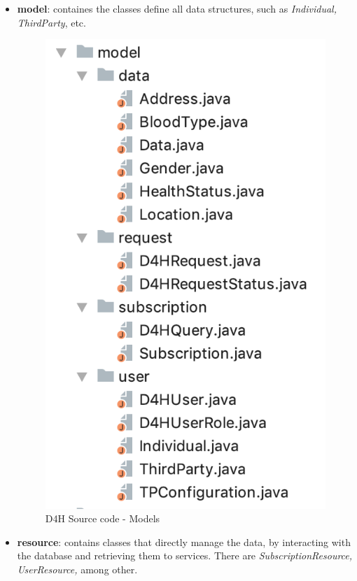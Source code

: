 \documentclass[a4paper, hidelinks, 12pt]{report}
\begin{document}
	\begin{itemize}
		\item \textbf{model}: containes the classes define all data structures, such as \textit{Individual, ThirdParty}, etc.

	\begin{figure}[H]
		\centering
		\includegraphics[scale=0.6]{images/backend/d4h_source_code_models.png}
		\caption[D4H Source code - Models]{D4H Source code - Models}
		\label{fig:d4h_source_code_models}
	\end{figure}

		\item \textbf{resource}: contains classes that directly manage the data, by interacting with the database and retrieving them to services. There are \textit{SubscriptionResource, UserResource,} among other.


\end{itemize}
\end{document}
